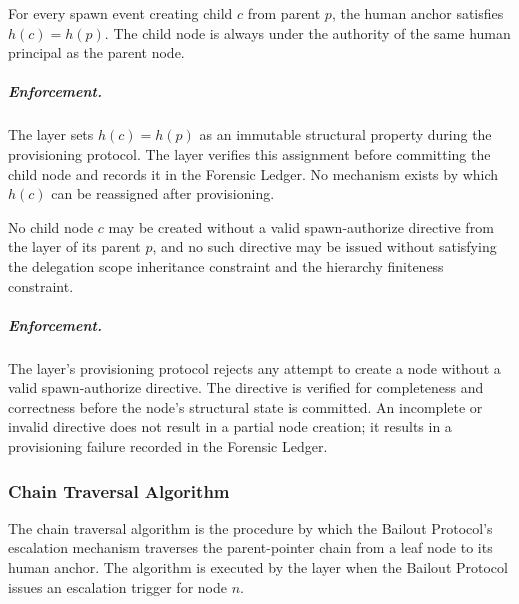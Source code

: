 \begin{invariant}\label{inv:human-anchor-inheritance}
For every spawn event creating child $c$ from parent $p$, the human anchor satisfies $h(c) = h(p)$. The child node is always under the authority of the same human principal as the parent node.
\end{invariant}

\subparagraph{Enforcement.} The \purpose{} layer sets $h(c) = h(p)$ as an immutable structural property during the provisioning protocol. The \fact{} layer verifies this assignment before committing the child node and records it in the Forensic Ledger. No mechanism exists by which $h(c)$ can be reassigned after provisioning.

\begin{invariant}\label{inv:spawn-auth-completeness}
No child node $c$ may be created without a valid spawn-authorize directive from the \purpose{} layer of its parent $p$, and no such directive may be issued without satisfying the delegation scope inheritance constraint and the hierarchy finiteness constraint.
\end{invariant}

\subparagraph{Enforcement.} The \fact{} layer's provisioning protocol rejects any attempt to create a node without a valid spawn-authorize directive. The directive is verified for completeness and correctness before the node's structural state is committed. An incomplete or invalid directive does not result in a partial node creation; it results in a provisioning failure recorded in the Forensic Ledger.

\subsubsection{Chain Traversal Algorithm}\label{sec:chain-traversal-algorithm}

The chain traversal algorithm is the procedure by which the Bailout Protocol's escalation mechanism traverses the parent-pointer chain from a leaf node to its human anchor. The algorithm is executed by the \fact{} layer when the Bailout Protocol issues an escalation trigger for node $n$.

